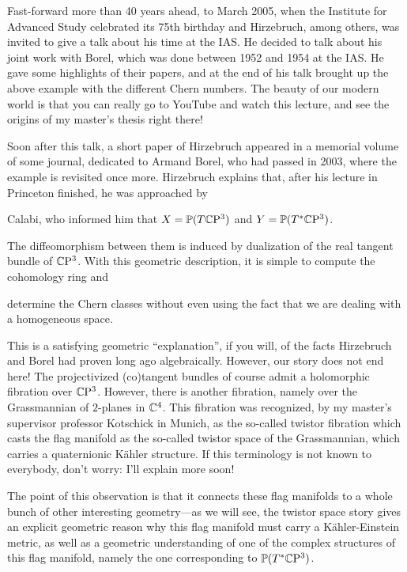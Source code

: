 \documentclass[parskip=half]{scrartcl}
\begin{document}
Fast-forward more than 40 years ahead, to March 2005, when the Institute for Advanced Study celebrated its 75th birthday and Hirzebruch, among others, was invited to give a talk about his time at the IAS. He decided to talk about his joint work with Borel, which was done between 1952 and 1954 at the IAS. He gave some highlights of their papers, and at the end of his talk brought up the above example with the different Chern numbers. The beauty of our modern world is that you can really go to YouTube and watch this lecture, and see the origins of my master's thesis right there!

Soon after this talk, a short paper of Hirzebruch appeared in a memorial volume of some journal, dedicated to Armand Borel, who had passed in 2003, where the example is revisited once more. Hirzebruch explains that, after his lecture in Princeton finished, he was approached by
\begin{onboard}
	Calabi, who informed him that $X=\mathbb{P}(T\mathbb{C}\mathrm{P}^3)$ and $Y=\mathbb{P}(T^*\mathbb{C}\mathrm{P}^3)$.
\end{onboard}
The diffeomorphism between them is induced by dualization of the real tangent bundle of $\mathbb{C}\mathrm{P}^3$. With this geometric description, it is simple to compute the cohomology ring and
\begin{onboard}
	determine the Chern classes without even using the fact that we are dealing with a homogeneous space.
\end{onboard}
This is a satisfying geometric ``explanation'', if you will, of the facts Hirzebruch and Borel had proven long ago algebraically. However, our story does not end here! The projectivized (co)tangent bundles of course admit a holomorphic fibration over $\mathbb{C}\mathrm{P}^3$. However, there is another fibration, namely over the Grassmannian of $2$-planes in $\mathbb{C}^4$. This fibration was recognized, by my master's supervisor professor Kotschick in Munich, as the so-called twistor fibration which casts the flag manifold as the so-called twistor space of the Grassmannian, which carries a quaternionic K\"ahler structure. If this terminology is not known to everybody, don't worry: I'll explain more soon! 

The point of this observation is that it connects these flag manifolds to a whole bunch of other interesting geometry---as we will see, the twistor space story gives an explicit geometric reason why this flag manifold must carry a K\"ahler-Einstein metric, as well as a geometric understanding of one of the complex structures of this flag manifold, namely the one corresponding to $\mathbb{P}(T^*\mathbb{C}\mathrm{P}^3)$. 
\end{document}
